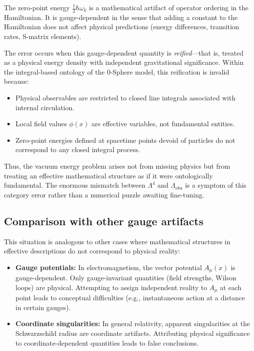 \documentclass[12pt,letterpaper]{article}
\begin{document}
The zero-point energy $\frac{1}{2}\hbar\omega_k$ is a mathematical artifact of operator ordering in the Hamiltonian. It is gauge-dependent in the sense that adding a constant to the Hamiltonian does not affect physical predictions (energy differences, transition rates, S-matrix elements).

The error occurs when this gauge-dependent quantity is \emph{reified}—that is, treated as a physical energy density with independent gravitational significance. Within the integral-based ontology of the 0-Sphere model, this reification is invalid because:

\begin{itemize}
\item Physical observables are restricted to closed line integrals associated with internal circulation.
\item Local field values $\phi(x)$ are effective variables, not fundamental entities.
\item Zero-point energies defined at spacetime points devoid of particles do not correspond to any closed integral process.
\end{itemize}

Thus, the vacuum energy problem arises not from missing physics but from treating an effective mathematical structure as if it were ontologically fundamental. The enormous mismatch between $\Lambda^4$ and $\Lambda_{\mathrm{obs}}$ is a symptom of this category error rather than a numerical puzzle awaiting fine-tuning.

\subsection{Comparison with other gauge artifacts}

This situation is analogous to other cases where mathematical structures in effective descriptions do not correspond to physical reality:

\begin{itemize}
\item \textbf{Gauge potentials:} In electromagnetism, the vector potential $A_\mu(x)$ is gauge-dependent. Only gauge-invariant quantities (field strengths, Wilson loops) are physical. Attempting to assign independent reality to $A_\mu$ at each point leads to conceptual difficulties (e.g., instantaneous action at a distance in certain gauges).

\item \textbf{Coordinate singularities:} In general relativity, apparent singularities at the Schwarzschild radius are coordinate artifacts. Attributing physical significance to coordinate-dependent quantities leads to false conclusions.
\end{itemize}
\end{document}
